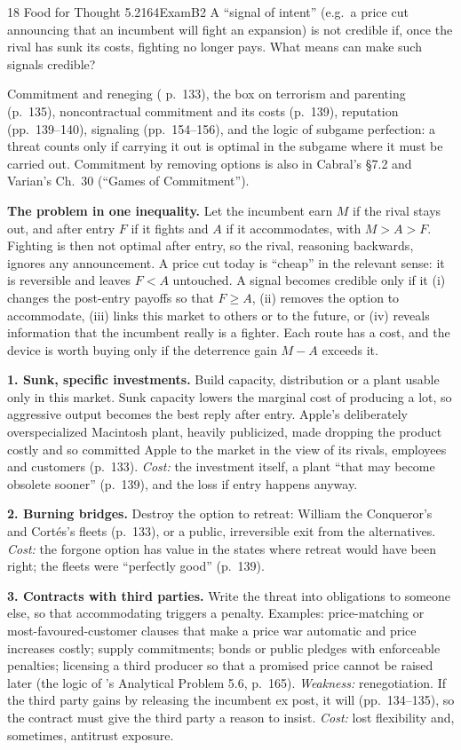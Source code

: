 \begin{exsol}{18}{\MR{} Food for Thought 5.2}{164}{Exam}{B2}
\asked A ``signal of intent'' (e.g.\ a price cut announcing that an incumbent will fight an
expansion) is not credible if, once the rival has sunk its costs, fighting no longer pays. What
means can make such signals credible?

\method Commitment and reneging (\MR{} p.~133), the box on terrorism and parenting (p.~135),
noncontractual commitment and its costs (p.~139), reputation (pp.~139--140), signaling
(pp.~154--156), and the logic of subgame perfection: a threat counts only if carrying it out is
optimal in the subgame where it must be carried out. Commitment by removing options is also in
Cabral's \S7.2 and Varian's Ch.~30 (``Games of Commitment'').

\solution
\textbf{The problem in one inequality.} Let the incumbent earn $M$ if the rival stays out, and
after entry $F$ if it fights and $A$ if it accommodates, with $M > A > F$. Fighting is then not
optimal after entry, so the rival, reasoning backwards, ignores any announcement. A price cut
today is ``cheap'' in the relevant sense: it is reversible and leaves $F < A$ untouched. A signal
becomes credible only if it (i) changes the post-entry payoffs so that $F \ge A$, (ii) removes
the option to accommodate, (iii) links this market to others or to the future, or (iv) reveals
information that the incumbent really is a fighter. Each route has a cost, and the device is worth
buying only if the deterrence gain $M - A$ exceeds it.

\textbf{1. Sunk, specific investments.} Build capacity, distribution or a plant usable only in
this market. Sunk capacity lowers the marginal cost of producing a lot, so aggressive output
becomes the best reply after entry. Apple's deliberately overspecialized Macintosh plant,
heavily publicized, made dropping the product costly and so committed Apple to the market in the
view of its rivals, employees and customers (p.~133). \emph{Cost:} the investment itself, a plant ``that may become obsolete
sooner'' (p.~139), and the loss if entry happens anyway.

\textbf{2. Burning bridges.} Destroy the option to retreat: William the Conqueror's and
Cort\'es's fleets (p.~133), or a public, irreversible exit from the alternatives. \emph{Cost:}
the forgone option has value in the states where retreat would have been right; the fleets were
``perfectly good'' (p.~139).

\textbf{3. Contracts with third parties.} Write the threat into obligations to someone else, so
that accommodating triggers a penalty. Examples: price-matching or most-favoured-customer clauses
that make a price war automatic and price increases costly; supply commitments; bonds or public
pledges with enforceable penalties; licensing a third producer so that a promised price cannot be
raised later (the logic of \MR's Analytical Problem 5.6, p.~165). \emph{Weakness:} renegotiation.
If the third party gains by releasing the incumbent ex post, it will (pp.~134--135), so the
contract must give the third party a reason to insist. \emph{Cost:} lost flexibility and,
sometimes, antitrust exposure.


\end{exsol}
